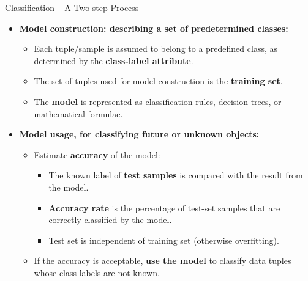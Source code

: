\begin{frame}{Classification -- A Two-step Process}
  \begin{itemize}
  \item \textbf{Model construction: describing a set of predetermined classes:}
    \begin{itemize}
    \item Each tuple/sample is assumed to belong to a predefined class, as determined by the \textbf{\color{airforceblue}class-label attribute}.
    \item The set of tuples used for model construction is the \textbf{\color{airforceblue}training set}.
    \item The \textbf{\color{airforceblue}model} is represented as classification rules, decision trees, or mathematical formulae.
    \end{itemize}
  \item \textbf{Model usage, for classifying future or unknown objects:}
    \begin{itemize}
    \item Estimate \textbf{\color{airforceblue}accuracy} of the model:
      \begin{itemize}
      \item The known label of \textbf{test samples} is compared with the result from the model.
      \item \textbf{Accuracy rate} is the percentage of test-set samples that are correctly classified by the model.
      \item Test set is independent of training set (otherwise overfitting).
      \end{itemize}
    \item If the accuracy is acceptable, \textbf{\color{airforceblue}use the model} to classify data tuples whose class labels are not known.
    \end{itemize}
  \end{itemize}
\end{frame}

